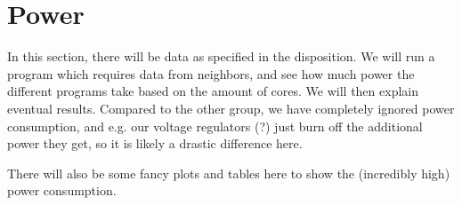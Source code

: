 \section{Power}

In this section, there will be data as specified in the disposition. We will run
a program which requires data from neighbors, and see how much power the
different programs take based on the amount of cores. We will then explain
eventual results. Compared to the other group, we have completely ignored power
consumption, and e.g. our voltage regulators (?) just burn off the additional
power they get, so it is likely a drastic difference here.

There will also be some fancy plots and tables here to show the (incredibly
high) power consumption.
